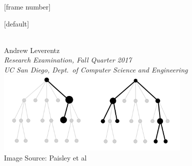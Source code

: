 
[frame number]  %

\usepackage[utf8]{inputenc} %
\usepackage{hyperref}       %
\usepackage{url}            %
\usepackage{booktabs}       %
\usepackage{amsmath}
\usepackage{amssymb}
\usepackage{amsthm}
\usepackage{amsfonts}       %
\usepackage{mathtools}
\usepackage{nicefrac}       %
\usepackage{microtype}      %
\usepackage{algorithm}
\usepackage{algpseudocode}
\usepackage{graphicx}
\usepackage{outlines}
\usepackage{dsfont}
\usepackage{float}
\usepackage{caption}
\usepackage{tikz}
\usepackage{multirow}
\usepackage{bigdelim}
\usepackage{scalerel}

\usetikzlibrary{bayesnet,positioning}

\newcommand{\nth}{^{\text{th}}}
\newcommand{\len}{\mathop{\text{len}}}
\newcommand{\indicator}{\mathds{1}}
\newcommand{\hackystatei}[1]{\State \parbox[t]{\dimexpr\linewidth-\algorithmicindent}{#1\strut}}
\newcommand{\hackystateii}[1]{\State \parbox[t]{\dimexpr\linewidth-\algorithmicindent-\algorithmicindent}{#1\strut}}

\newcommand{\customSectionFrame}[1]{%
  \begin{frame}[c]{ } %
  \Large
  \color[rgb]{0,0,0.6}
  \centering %
  #1 %
  \end{frame}%
  }

[default]



\begin{frame}
\vspace{3em}
\begin{center}
 \\[1em]
Andrew Leverentz \\[1em]
{ \small
\emph{Research Examination, Fall Quarter 2017} \\
\emph{UC San Diego, Dept.\ of Computer Science and Engineering}} \\[2em]
\includegraphics[width=0.7\textwidth]{../figures/title_image.png} \\[1em]
{\color[rgb]{0.5,0.5,0.5} \tiny Image Source: Paisley et al \cite{paisley2015nhdp}}
\end{center}
\end{frame}

